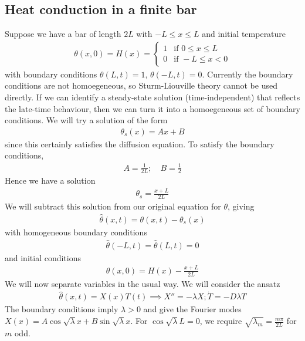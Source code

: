 \subsection{Heat conduction in a finite bar}
Suppose we have a bar of length $2L$ with $-L \leq x \leq L$ and initial temperature
\begin{align*}
	\theta(x,0) = H(x) = \begin{cases}
		1 & \text{if } 0 \leq x \leq L \\
		0 & \text{if } -L \leq x < 0
	\end{cases}
\end{align*}
with boundary conditions $\theta(L, t) = 1$, $\theta(-L, t) = 0$.
Currently the boundary conditions are not homoegeneous, so Sturm-Liouville theory cannot be used directly.
If we can identify a steady-state solution (time-independent) that reflects the late-time behaviour, then we can turn it into a homoegeneous set of boundary conditions.
We will try a solution of the form
\begin{align*}
	\theta_s(x) = Ax + B
\end{align*}
since this certainly satisfies the diffusion equation.
To satisfy the boundary conditions,
\begin{align*}
	A = \frac{1}{2L};\quad B = \frac{1}{2}
\end{align*}
Hence we have a solution
\begin{align*}
	\theta_s = \frac{x + L}{2L}
\end{align*}
We will subtract this solution from our original equation for $\theta$, giving
\begin{align*}
	\hat \theta(x,t) = \theta(x,t) - \theta_s(x)
\end{align*}
with homogeneous boundary conditions
\begin{align*}
	\hat \theta(-L, t) = \hat \theta(L, t) = 0
\end{align*}
and initial conditions
\begin{align*}
	\theta(x,0) = H(x) - \frac{x+L}{2L}
\end{align*}
We will now separate variables in the usual way.
We will consider the ansatz
\begin{align*}
	\hat \theta(x,t) = X(x) T(t) \implies X'' = - \lambda X; \dot T = -D \lambda T
\end{align*}
The boundary conditions imply $\lambda > 0$ and give the Fourier modes $X(x) = A \cos \sqrt{\lambda} x + B \sin \sqrt{\lambda} x$.
For $\cos \sqrt{\lambda} L = 0$, we require $\sqrt{\lambda_m} = \frac{m \pi}{2L}$ for $m$ odd.
